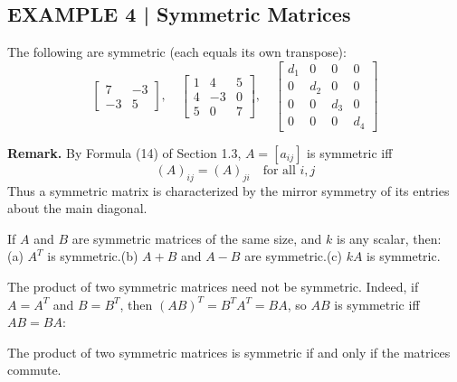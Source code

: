 \documentclass{article}
\theoremstyle{mystyle}
\begin{document}
\subsection*{EXAMPLE 4 | Symmetric Matrices}
The following are symmetric (each equals its own transpose):
\[
\begin{bmatrix}7&-3\\-3&5\end{bmatrix},\quad
\begin{bmatrix}1&4&5\\4&-3&0\\5&0&7\end{bmatrix},\quad
\begin{bmatrix}d_1&0&0&0\\0&d_2&0&0\\0&0&d_3&0\\0&0&0&d_4\end{bmatrix}
\]

\textbf{Remark.} By Formula (14) of Section 1.3, $A=[a_{ij}]$ is symmetric iff
\begin{equation}
(A)_{ij}=(A)_{ji} \quad\text{for all }i,j \tag{4}
\end{equation}
Thus a symmetric matrix is characterized by the mirror symmetry of its entries about the main diagonal.

\begin{tcolorbox}[colback=red!4, colframe=red!60!black, title=Theorem 1.7.2, boxrule=0.5mm, arc=3mm]
If $A$ and $B$ are symmetric matrices of the same size, and $k$ is any scalar, then:\\
(a) $A^T$ is symmetric.\quad (b) $A+B$ and $A-B$ are symmetric.\quad (c) $kA$ is symmetric.
\end{tcolorbox}

The product of two symmetric matrices need not be symmetric. Indeed, if $A=A^T$ and $B=B^T$, then $(AB)^T=B^TA^T=BA$, so $AB$ is symmetric iff $AB=BA$:

\begin{tcolorbox}[colback=red!4, colframe=red!60!black, title=Theorem 1.7.3, boxrule=0.5mm, arc=3mm]
The product of two symmetric matrices is symmetric if and only if the matrices commute.
\end{tcolorbox}
\end{document}
